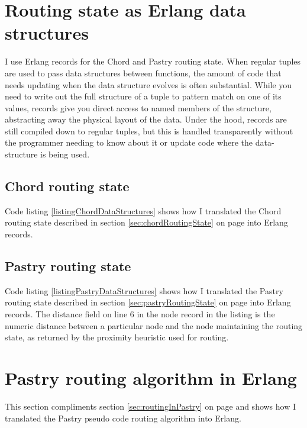 \chapter{Routing state as Erlang data structures}
\label{sec:appendixErlangRoutingState}
I use Erlang records for the Chord and Pastry routing state.
When regular tuples are used to pass data structures between functions, the amount of code that needs updating when the data structure evolves is often substantial.
While you need to write out the full structure of a tuple to pattern match on one of its values, records give you direct access to named members of the structure, abstracting away the physical layout of the data.
Under the hood, records are still compiled down to regular tuples, but this is handled transparently  without the programmer needing to know about it or update code where the data-structure is being used.

\section{Chord routing state}
Code listing \ref{listingChordDataStructures} shows how I translated the Chord routing state described in section \ref{sec:chordRoutingState} on page \pageref{sec:chordRoutingState} into Erlang records.



\section{Pastry routing state}
Code listing \ref{listingPastryDataStructures} shows how I translated the Pastry routing state described in section \ref{sec:pastryRoutingState} on page \pageref{sec:pastryRoutingState} into Erlang records.
The distance field on line 6 in the node record in the listing is the numeric distance between a particular node and the node maintaining the routing state, as returned by the proximity heuristic used for routing.



\chapter{Pastry routing algorithm in Erlang}
\label{sec:appendixErlangRoutingAlgorithm}
This section compliments section \ref{sec:routingInPastry} on page \pageref{sec:routingInPastry} and shows how I translated the Pastry pseudo code routing algorithm into Erlang.

